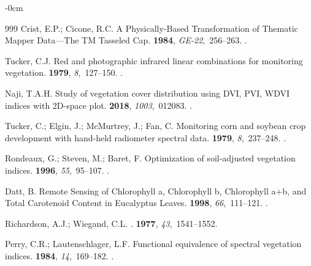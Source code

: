 \documentclass[jmse,article,accept,pdftex,moreauthors]{Definitions/mdpi}
\begin{document}
\begin{adjustwidth}{-\extralength}{0cm}
\begin{thebibliography}{999}
Crist, E.P.; Cicone, R.C.
\newblock A Physically-Based Transformation of Thematic Mapper Data---The TM
  Tasseled Cap.
 {\bf 1984}, {\em
  GE-22},~256--263.
.

Tucker, C.J.
\newblock Red and photographic infrared linear combinations for monitoring
  vegetation.
 {\bf 1979}, {\em 8},~127--150.
.

Naji, T.A.H.
\newblock Study of vegetation cover distribution using DVI, PVI, WDVI indices
  with 2D-space plot.
 {\bf 2018}, {\em 1003},~012083.
.

Tucker, C.; Elgin, J.; McMurtrey, J.; Fan, C.
\newblock Monitoring corn and soybean crop development with hand-held
  radiometer spectral data.
 {\bf 1979}, {\em 8},~237--248.
.

Rondeaux, G.; Steven, M.; Baret, F.
\newblock Optimization of soil-adjusted vegetation indices.
 {\bf 1996}, {\em 55},~95--107.
.

Datt, B.
\newblock Remote Sensing of Chlorophyll a, Chlorophyll b, Chlorophyll a+b, and
  Total Carotenoid Content in Eucalyptus Leaves.
 {\bf 1998}, {\em 66},~111--121.
.

Richardson, A.J.; Wiegand, C.L.
.
 {\bf 1977}, {\em 43},~1541--1552.

Perry, C.R.; Lautenschlager, L.F.
\newblock Functional equivalence of spectral vegetation indices.
 {\bf 1984}, {\em 14},~169--182.
.


\end{thebibliography}
\end{adjustwidth}
\end{document}
